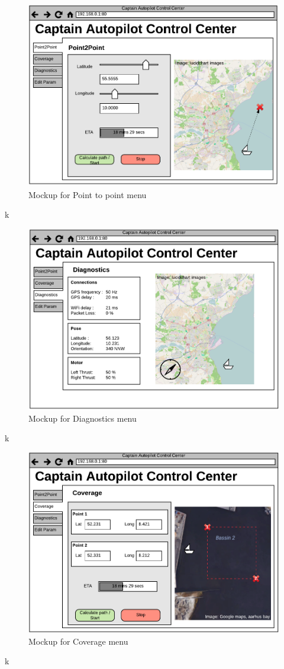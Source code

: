 \begin{figure}[H]
	\centering
	\includegraphics[width=1\linewidth]{Images/Design/UI_Mockup_Point_to_point.pdf}
	\caption{Mockup for Point to point menu}
\end{figure}

k

\begin{figure}[H]
	\centering
	\includegraphics[width=1\linewidth]{Images/Design/UI_Mockup_Diagnostics.pdf}
	\caption{Mockup for Diagnostics menu}
\end{figure}

k

\begin{figure}[H]
	\centering
	\includegraphics[width=1\linewidth]{Images/Design/UI_Mockup_Coverage.pdf}
	\caption{Mockup for Coverage menu}
\end{figure}

k